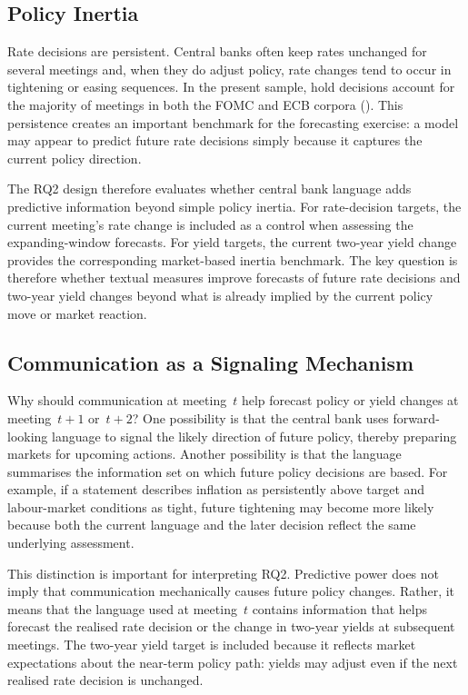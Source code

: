 \subsection{Policy Inertia}

Rate decisions are persistent. Central banks often keep rates unchanged
for several meetings and, when they do adjust policy, rate changes tend
to occur in tightening or easing sequences. In the present sample, hold
decisions account for the majority of meetings in both the FOMC and ECB
corpora (). This persistence creates an
important benchmark for the forecasting exercise: a model may appear to
predict future rate decisions simply because it captures the current
policy direction.

The RQ2 design therefore evaluates whether central bank language adds
predictive information beyond simple policy inertia. For rate-decision
targets, the current meeting's rate change is included as a control when
assessing the expanding-window forecasts. For yield targets, the current
two-year yield change provides the corresponding market-based inertia
benchmark. The key question is therefore whether textual measures improve
forecasts of future rate decisions and two-year yield changes beyond
what is already implied by the current policy move or market reaction.

\subsection{Communication as a Signaling Mechanism}

Why should communication at meeting~$t$ help forecast policy or yield
changes at meeting~$t+1$ or~$t+2$? One possibility is that the central
bank uses forward-looking language to signal the likely direction of
future policy, thereby preparing markets for upcoming actions. Another
possibility is that the language summarises the information set on which
future policy decisions are based. For example, if a statement describes
inflation as persistently above target and labour-market conditions as
tight, future tightening may become more likely because both the current
language and the later decision reflect the same underlying assessment.

This distinction is important for interpreting RQ2. Predictive power
does not imply that communication mechanically causes future policy
changes. Rather, it means that the language used at meeting~$t$ contains
information that helps forecast the realised rate decision or the change
in two-year yields at subsequent meetings. The two-year yield target is
included because it reflects market expectations about the near-term
policy path: yields may adjust even if the next realised rate decision is
unchanged.


